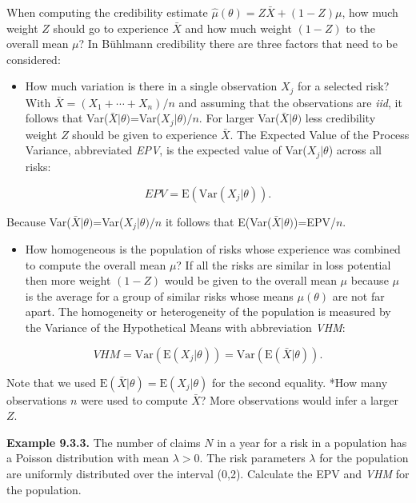 \documentclass[]{book}
\providecommand{\tightlist}{%
  \setlength{\itemsep}{0pt}\setlength{\parskip}{0pt}}
\theoremstyle{definition}
\theoremstyle{definition}
\theoremstyle{definition}
\theoremstyle{remark}
\begin{document}
When computing the credibility estimate
\(\hat{\mu}(\theta)=Z\bar{X}+(1-Z)\mu\), how much weight \(Z\) should go
to experience \(\bar{X}\) and how much weight \((1-Z)\) to the overall
mean \(\mu\)? In Bühlmann credibility there are three factors that need
to be considered:

\begin{itemize}
\tightlist
\item
  How much variation is there in a single observation \(X_j\) for a
  selected risk? With \(\bar{X}=(X_1+\cdots+X_n)/n\) and assuming that
  the observations are \emph{iid}, it follows that
  Var(\(\bar{X}|\theta)\)=Var(\(X_j|\theta)/n\). For larger
  Var(\(\bar{X}|\theta)\) less credibility weight \(Z\) should be given
  to experience \(\bar{X}\). The Expected Value of the Process Variance,
  abbreviated \emph{EPV}, is the expected value of Var(\(X_j|\theta\))
  across all risks:
\end{itemize}

\begin{equation*}
EPV=\mathrm{E}(\mathrm{Var}(X_j|\theta)). 
\end{equation*}

Because Var(\(\bar{X}|\theta)\)=Var(\(X_j|\theta)/n\) it follows that
E(Var(\(\bar{X}|\theta)\))=EPV/\(n\).

\begin{itemize}
\tightlist
\item
  How homogeneous is the population of risks whose experience was
  combined to compute the overall mean \(\mu\)? If all the risks are
  similar in loss potential then more weight \((1-Z)\) would be given to
  the overall mean \(\mu\) because \(\mu\) is the average for a group of
  similar risks whose means \(\mu(\theta)\) are not far apart. The
  homogeneity or heterogeneity of the population is measured by the
  Variance of the Hypothetical Means with abbreviation \emph{VHM}:
\end{itemize}

\begin{equation*}
VHM=\mathrm{Var}(\mathrm{E}(X_j|\theta))=\mathrm{Var}(\mathrm{E}(\bar{X}|\theta)). 
\end{equation*}

Note that we used \(\mathrm{E}(\bar{X}|\theta)=\mathrm{E}(X_j|\theta)\)
for the second equality. *How many observations \(n\) were used to
compute \(\bar{X}\)? More observations would infer a larger \(Z\).

\textbf{Example 9.3.3.} The number of claims \(N\) in a year for a risk
in a population has a Poisson distribution with mean \(\lambda>0\). The
risk parameters \(\lambda\) for the population are uniformly distributed
over the interval (0,2). Calculate the EPV and \emph{VHM} for the
population.
\end{document}
